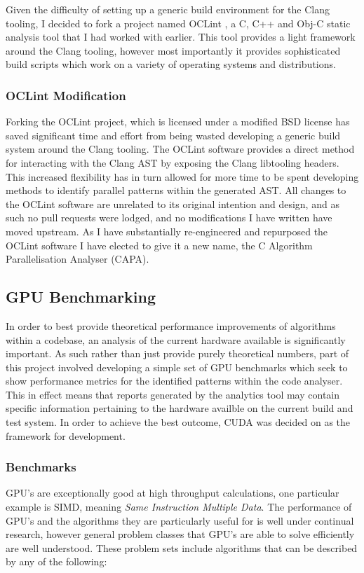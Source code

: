Given the difficulty of setting up a generic build environment for the Clang tooling, I decided to
fork a project named OCLint \cite{oclint}, a C, C++ and Obj-C static analysis tool that I had worked with earlier.
This tool provides a light framework around the Clang tooling, however most importantly it provides
sophisticated build scripts which work on a variety of operating systems and distributions.

\subsubsection{OCLint Modification} 
Forking the OCLint project, which is licensed under a modified
BSD license has saved significant time and effort from being wasted developing a generic build
system around the Clang tooling. The OCLint software provides a direct method for interacting with
the Clang AST by exposing the Clang libtooling headers. This increased flexibility has in turn
allowed for more time to be spent developing methods to identify parallel patterns within the
generated AST. All changes to the OCLint software are unrelated to its original
intention and design, and as such no pull requests were lodged, and no modifications I
have written have moved upstream. As I have substantially re-engineered and repurposed the OCLint
software I have elected to give it a new name, the C Algorithm Parallelisation Analyser (CAPA).

\subsection{GPU Benchmarking}
In order to best provide theoretical performance improvements of
algorithms within a codebase, an analysis of the current hardware available is significantly
important. As such rather than just provide purely theoretical numbers, part of this project
involved developing a simple set of GPU benchmarks which seek to show performance metrics for the
identified patterns within the code analyser. This in effect means that reports generated by the
analytics tool may contain specific information pertaining to the hardware availble on the current
build and test system. In order to achieve the best outcome, CUDA was decided on as the framework
for development.

\subsubsection{Benchmarks}
GPU's are exceptionally good at high throughput calculations, one
particular example is SIMD, meaning \emph{Same Instruction Multiple Data}. The performance of GPU's
and the algorithms they are particularly useful for is well under continual research, however
general problem classes that GPU's are able to solve efficiently are well understood. These problem
sets include algorithms that can be described by any of the following:


